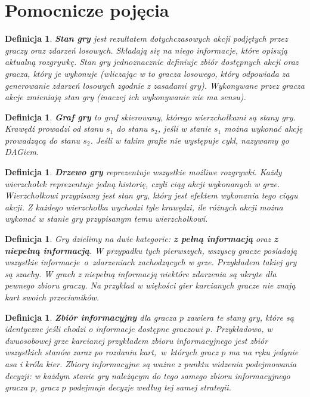 \documentclass[magisterska]{pracamgr}
\newtheorem{definition}[theorem]{Definicja}
\begin{document}
\section{Pomocnicze pojęcia}

\begin{definition}
      \textbf{Stan gry} jest rezultatem dotychczasowych akcji podjętych przez graczy oraz zdarzeń losowych.
      Składają się na niego informacje, które opisują aktualną rozgrywkę.
      Stan gry jednoznacznie definiuje zbiór dostępnych
      akcji oraz gracza, który je wykonuje (wliczając w to gracza losowego, który odpowiada
      za generowanie zdarzeń losowych zgodnie z zasadami gry). Wykonywane przez gracza akcje
      zmieniają stan gry (inaczej ich wykonywanie nie ma sensu).
\end{definition}

\begin{definition}
      \textbf{Graf gry} to graf skierowany, którego wierzchołkami są stany gry. Krawędź prowadzi od stanu
      $s_1$ do stanu $s_2$, jeśli w stanie $s_1$ można wykonać akcję prowadzącą do stanu
      $s_2$. Jeśli w takim grafie nie występuje cykl, nazywamy go DAGiem.
\end{definition}

\begin{definition}
      \textbf{Drzewo gry} reprezentuje wszystkie możliwe rozgrywki. Każdy wierzchołek reprezentuje jedną historię,
      czyli ciąg akcji wykonanych w grze. Wierzchołkowi przypisany jest stan gry, który jest efektem
      wykonania tego ciągu akcji. Z każdego wierzchołka wychodzi tyle krawędzi, ile różnych
      akcji można wykonać w stanie gry przypisanym temu wierzchołkowi.
\end{definition}

\begin{definition}
      Gry dzielimy na dwie kategorie: \textbf{z pełną informacją} oraz \textbf{z niepełną informacją}.
      W przypadku tych pierwszych, wszyscy gracze posiadają wszystkie informacje~o~zdarzeniach
      zachodzących w grze. Przykładem takiej gry są szachy. W grach z niepełną informacją niektóre
      zdarzenia są ukryte dla pewnego zbioru graczy. Na przykład w więkości gier karcianych gracze
      nie znają kart swoich przeciwników.
\end{definition}

\begin{definition}
      \textbf{Zbiór informacyjny} dla gracza $p$ zawiera te stany gry, które są identyczne jeśli chodzi
      o informacje dostępne graczowi $p$. Przykładowo, w dwuosobowej grze karcianej przykładem zbioru informacyjnego
      jest zbiór wszystkich stanów zaraz po rozdaniu kart,~w~których gracz $p$ ma na ręku jedynie asa i króla kier.
      Zbiory informacyjne są ważne z punktu widzenia podejmowania decyzji: w każdym stanie gry należącym do tego
      samego zbioru informacyjnego gracza $p$, gracz $p$ podejmuje decyzje według tej samej strategii.
\end{definition}
\end{document}
